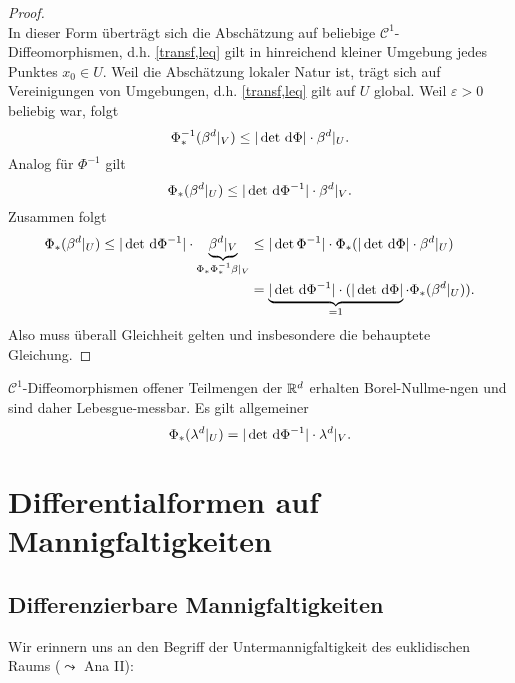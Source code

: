 \begin{satz}
\begin{proof}
\begin{equation}
\end{equation}
In dieser Form überträgt sich die Abschätzung auf beliebige $\mathcal{C}^1$-Diffeomorphismen, d.h. \eqref{transf,leq} gilt in hinreichend kleiner Umgebung jedes Punktes $x_0\in U$. Weil die Abschätzung lokaler Natur ist, trägt sich auf Vereinigungen von Umgebungen, d.h. \eqref{transf,leq} gilt auf $U$ global. Weil $\varepsilon>0$ beliebig war, folgt
$$\Phi^{-1}_*(\beta^d|_V)\leq |\det \, \mathrm{d} \Phi| \cdot \beta^d|_U.
$$
Analog für $\Phi^{-1}$ gilt
$$\Phi_*(\beta^d|_U)\leq |\det \, \mathrm{d} \Phi^{-1}| \cdot \beta^d|_V.$$
Zusammen folgt
\begin{equation*}
\begin{split}
\Phi_*(\beta^d|_U)\leq |\det \, \mathrm{d} \Phi^{-1}| \cdot \underbrace{\beta^d|_V}_{\Phi_*\Phi^{-1}_*\beta|_V} &\leq |\det \Phi^{-1}|\cdot \Phi_*(|\det \, \mathrm{d} \Phi| \cdot \beta^d|_U) \\
&= \underbrace{|\det \, \mathrm{d}\Phi^{-1}|\cdot (|\det \, \mathrm{d} \Phi|}_{=1}\cdot \Phi_*(\beta^d|_U)).
\end{split}
\end{equation*}
Also muss überall Gleichheit gelten und insbesondere die behauptete Gleichung.
\end{proof}
\end{satz}

\begin{korollar}
\begin{mdframed}
$\mathcal{C}^1$-Diffeomorphismen offener Teilmengen der $\mathbb{R}^d$ erhalten Borel-Nullme-ngen und sind daher Lebesgue-messbar. Es gilt allgemeiner
\begin{equation}
\Phi_*(\lambda^d|_U)=|\det \, \mathrm{d} \Phi^{-1}|\cdot \lambda^d|_V.
\end{equation}
\end{mdframed}
\end{korollar}


\section{Differentialformen auf Mannigfaltigkeiten}
\subsection{Differenzierbare Mannigfaltigkeiten}
Wir erinnern uns an den Begriff der Untermannigfaltigkeit des euklidischen Raums ($\leadsto$ Ana II):

